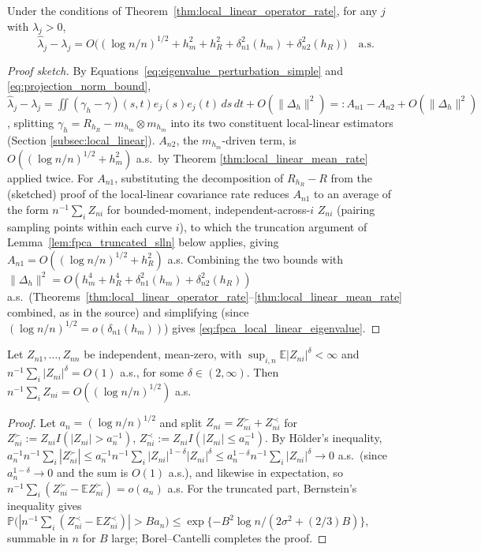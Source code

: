 \begin{theorem}
\label{thm:fpca_local_linear_eigenvalue}
Under the conditions of Theorem~\ref{thm:local_linear_operator_rate}, for
any $j$ with $\lambda_j>0$,
\begin{equation}
\widehat\lambda_j-\lambda_j = O\big((\log n/n)^{1/2}+h_m^2+h_R^2+
\delta_{n1}^2(h_m)+\delta_{n2}^2(h_R)\big) \quad\text{a.s.}
\label{eq:fpca_local_linear_eigenvalue}
\end{equation}
\end{theorem}

\begin{proof}[Proof sketch]
By Equations~\eqref{eq:eigenvalue_perturbation_simple} and
\eqref{eq:projection_norm_bound}, $\widehat\lambda_j-\lambda_j =
\iint(\gamma_h-\gamma)(s,t)e_j(s)e_j(t)\,ds\,dt + O(\|\Delta_h\|^2) =: A_{n1}
-A_{n2}+O(\|\Delta_h\|^2)$, splitting $\gamma_h=R_{h_R}-m_{h_m}\otimes
m_{h_m}$ into its two constituent local-linear estimators (Section
\ref{subsec:local_linear}). $A_{n2}$, the $m_{h_m}$-driven term, is
$O((\log n/n)^{1/2}+h_m^2)$ a.s.\ by Theorem
\ref{thm:local_linear_mean_rate} applied twice. For $A_{n1}$, substituting
the decomposition of $R_{h_R}-R$ from the (sketched) proof of the
local-linear covariance rate reduces $A_{n1}$ to an average of the form
$n^{-1}\sum_iZ_{ni}$ for bounded-moment, independent-across-$i$ $Z_{ni}$
(pairing sampling points within each curve $i$), to which the truncation
argument of Lemma~\ref{lem:fpca_truncated_slln} below applies, giving
$A_{n1}=O((\log n/n)^{1/2}+h_R^2)$ a.s. Combining the two bounds with
$\|\Delta_h\|^2=O(h_m^4+h_R^4+\delta_{n1}^2(h_m)+\delta_{n2}^2(h_R))$ a.s.\
(Theorems~\ref{thm:local_linear_operator_rate}--\ref{thm:local_linear_mean_rate}
combined, as in the source) and simplifying (since $(\log n/n)^{1/2}=
o(\delta_{n1}(h_m))$) gives \eqref{eq:fpca_local_linear_eigenvalue}.
\end{proof}

\begin{lemma}
\label{lem:fpca_truncated_slln}
Let $Z_{n1},\dots,Z_{nn}$ be independent, mean-zero, with $\sup_{i,n}
\mathbb{E}|Z_{ni}|^\delta<\infty$ and $n^{-1}\sum_i|Z_{ni}|^\delta=O(1)$
a.s., for some $\delta\in(2,\infty)$. Then $n^{-1}\sum_iZ_{ni} =
O((\log n/n)^{1/2})$ a.s.
\end{lemma}

\begin{proof}
Let $a_n=(\log n/n)^{1/2}$ and split $Z_{ni}=Z_{ni}^\succ+Z_{ni}^\prec$ for
$Z_{ni}^\succ:=Z_{ni}I(|Z_{ni}|>a_n^{-1})$, $Z_{ni}^\prec:=Z_{ni}I(|Z_{ni}|
\leq a_n^{-1})$. By H\"older's inequality, $a_n^{-1}n^{-1}\sum_i|Z_{ni}
^\succ| \leq a_n^{-1}n^{-1}\sum_i|Z_{ni}|^{1-\delta}|Z_{ni}|^\delta \leq
a_n^{1-\delta}n^{-1}\sum_i|Z_{ni}|^\delta \to0$ a.s.\ (since $a_n^{1-\delta}
\to0$ and the sum is $O(1)$ a.s.), and likewise in expectation, so
$n^{-1}\sum_i(Z_{ni}^\succ-\mathbb{E}Z_{ni}^\succ)=o(a_n)$ a.s. For the
truncated part, Bernstein's inequality gives $\mathbb{P}\big(|n^{-1}\sum_i
(Z_{ni}^\prec-\mathbb{E}Z_{ni}^\prec)|>Ba_n\big) \leq \exp\{-B^2\log n/
(2\sigma^2+(2/3)B)\}$, summable in $n$ for $B$ large; Borel--Cantelli
completes the proof.
\end{proof}

